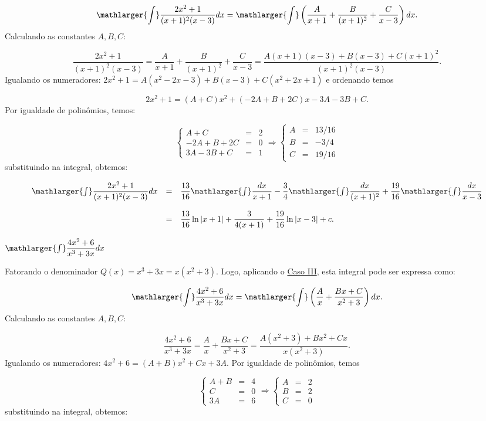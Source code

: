 \cleardoublepage\documentclass[../main.tex]{subfiles}
\begin{document}
\begin{exeresol}
\begin{compactenum}[a)]
\begin{solution}
\[ \mathlarger{\int}\dfrac{2x^2+1}{(x+1)^2(x-3)} dx =\mathlarger{\int}\left(\dfrac{A}{x+1}+ \dfrac{B}{(x+1)^2}+ \dfrac{C}{x-3} \right) dx. \]
Calculando as constantes \(A,B,C\):

\[ \dfrac{2x^2+1}{(x+1)^2(x-3)}= \dfrac{A}{x+1}+ \dfrac{B}{(x+1)^2}+ \dfrac{C}{x-3} = \dfrac{A(x+1)(x-3)+B(x-3)+C(x+1)^2}{(x+1)^2(x-3)}. \]
Igualando os numeradores: \(2x^2+1 = A(x^2-2x-3)+B(x-3)+C(x^2+2x+1)\) e ordenando temos

\[ 2x^2+1=(A+C)x^2 +(-2A+B+2C)x -3A-3B+C. \]
Por igualdade de polinômios, temos:

\[ \left\{ \begin{array}{rcl} A+C &=&2\\ -2A+B+2C &=&0\\ 3A-3B+C&=&1 \end{array} \right. \Rightarrow \left\{ \begin{array}{ccr} A&=&{13}/{16}\\ B&=&-{3}/{4}\\ C&=&{19}/{16} \end{array} \right. \]
substituindo na integral, obtemos:

\[ \begin{array}{rcl} \mathlarger{\int}\dfrac{2x^2+1}{(x+1)^2(x-3)} dx &=&\dfrac{13}{16}\mathlarger{\int}\dfrac{dx}{x+1} -\dfrac{3}{4}\mathlarger{\int} \dfrac{dx}{(x+1)^2}+ \dfrac{19}{16}\mathlarger{\int}\dfrac{dx}{x-3}\\ \\ &=& \dfrac{13}{16}\ln|x+1|+ \dfrac{3}{4(x+1)}+ \dfrac{19}{16}\ln|x-3|+c. \end{array} \]
\end{solution}
\item \(\mathlarger{\int}\dfrac{4x^2+6}{x^3+3x} dx\)

\begin{solution}
Fatorando o denominador \(Q(x)=x^3+3x= x(x^2+3)\). Logo, aplicando o \hyperlink{FracParcCasoIII}{Caso III}, esta integral pode ser expressa como:

\[ \mathlarger{\int}\dfrac{4x^2+6}{x^3+3x} dx =\mathlarger{\int}\left(\dfrac{A}{x}+ \dfrac{Bx+C}{x^2+3}\right) dx. \]
Calculando as constantes \(A,B,C\):

\[ \dfrac{4x^2+6}{x^3+3x}= \dfrac{A}{x}+ \dfrac{Bx+C}{x^2+3} = \dfrac{A(x^2+3) +Bx^2 +Cx}{x(x^2+3)}. \]
Igualando os numeradores: \(4x^2+6= (A+B)x^2 +Cx +3A\). Por igualdade de polinômios, temos

\[ \left\{ \begin{array}{rcl} A+B &=&4\\ C &=&0\\ 3A&=&6 \end{array} \right. \Rightarrow \left\{ \begin{array}{ccr} A&=&2\\ B&=&2\\ C&=&0 \end{array} \right. \]
substituindo na integral, obtemos:


\end{solution}
\end{compactenum}
\end{exeresol}
\end{document}
